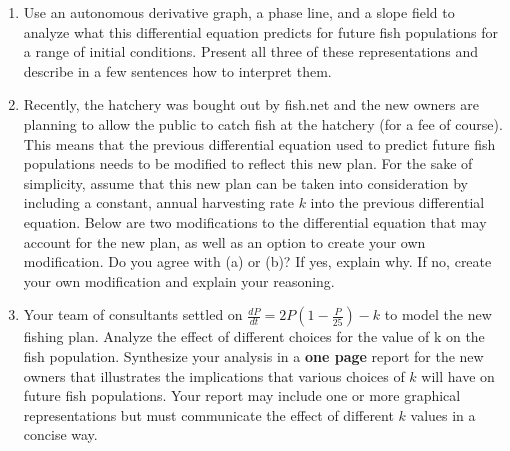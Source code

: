 \begin{enumerate}
\item Use an autonomous derivative graph, a phase line, and a slope field to analyze what this differential equation predicts for future fish populations for a range of initial conditions. Present all three of these representations and describe in a few sentences how to interpret them. \label{08problem1}
\clearpage

\item	Recently, the hatchery was bought out by fish.net and the new owners are planning to allow the public to catch fish at the hatchery (for a fee of course). This means that the previous differential equation used to predict future fish populations needs to be modified to reflect this new plan. For the sake of simplicity, assume that this new plan can be taken into consideration by including a constant, annual harvesting rate $k$ into the previous differential equation. Below are two modifications to the differential equation that may account for the new plan, as well as an option to create your own modification. Do you agree with (a) or (b)? If yes, explain why. If no, create your own modification and explain your reasoning. \label{08problem2} \\
\vs
{}
\clearpage
	
\item	Your team of consultants settled on $\displaystyle\frac{dP}{dt} = 2P\left(1-\frac{P}{25}\right) - k$ to model the new fishing plan.  Analyze the effect of different choices for the value of k on the fish population. Synthesize your analysis in a \textbf{one page} report for the new owners that illustrates the implications that various choices of $k$ will have on future fish populations. Your report may include one or more graphical representations but must communicate the effect of different $k$ values in a concise way. \label{08problem3}

\clearpage


\end{enumerate}
